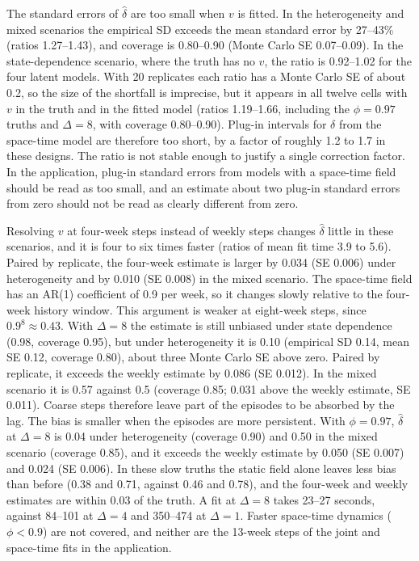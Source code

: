 The standard errors of $\hat\delta$ are too small when $v$ is fitted. In the
heterogeneity and mixed scenarios the empirical SD exceeds the mean standard error by
27--43\% (ratios 1.27--1.43), and coverage is 0.80--0.90 (Monte Carlo SE 0.07--0.09).
In the state-dependence scenario, where the truth has no $v$, the ratio is
0.92--1.02 for the four latent models. With 20
replicates each ratio has a Monte Carlo SE of about 0.2, so the size of the shortfall is
imprecise, but it appears in all twelve cells with $v$ in the truth and in the fitted
model (ratios 1.19--1.66, including the $\phi = 0.97$ truths and $\Delta = 8$, with
coverage 0.80--0.90). Plug-in intervals for $\delta$ from the space-time model are
therefore too short, by a factor of roughly 1.2 to 1.7 in these designs. The ratio is
not stable enough to justify a single correction factor. In the application, plug-in
standard errors from models with a space-time field should be read as too small, and
an estimate about two plug-in standard errors from zero should not be read as clearly
different from zero.

Resolving $v$ at four-week steps instead of weekly steps changes $\hat\delta$ little in
these scenarios, and it is four to six times faster (ratios of mean fit time 3.9 to
5.6). Paired by replicate, the four-week
estimate is larger by 0.034 (SE 0.006) under heterogeneity and by 0.010 (SE 0.008) in
the mixed scenario. The space-time field has an AR(1) coefficient of 0.9 per week, so it
changes slowly relative to the four-week history window. This argument is weaker at
eight-week steps, since $0.9^8 \approx 0.43$. With
$\Delta = 8$ the estimate is still unbiased under state dependence (0.98, coverage
0.95), but under heterogeneity it is 0.10 (empirical SD 0.14, mean SE 0.12, coverage
0.80), about three Monte Carlo SE above zero. Paired by replicate, it exceeds the weekly
estimate by 0.086 (SE 0.012). In the mixed scenario it is 0.57 against 0.5 (coverage
0.85; 0.031 above the weekly estimate, SE 0.011). Coarse steps therefore leave part of
the episodes to be absorbed by the lag. The bias is smaller when the episodes are more
persistent. With $\phi = 0.97$, $\hat\delta$ at $\Delta = 8$ is 0.04 under
heterogeneity (coverage 0.90) and 0.50 in the mixed scenario (coverage 0.85), and it
exceeds the weekly estimate by 0.050 (SE 0.007) and 0.024 (SE 0.006). In these slow
truths the static field alone leaves less bias than before (0.38 and 0.71, against 0.46
and 0.78), and the four-week and weekly estimates are within 0.03 of the truth. A fit
at $\Delta = 8$ takes 23--27 seconds, against 84--101 at $\Delta = 4$ and 350--474
at $\Delta = 1$. Faster space-time dynamics ($\phi < 0.9$) are
not covered, and neither are the 13-week steps of the joint and space-time fits in
the application.

\begin{table}
\caption{S1: estimation of the state-dependence parameter $\delta$ (20 replicates per
scenario).}\label{tab:s3}
\centering\small

\end{table}
